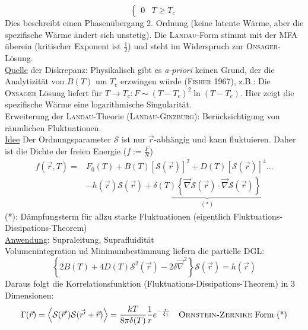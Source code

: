 \begin{enumerate}[A)]
\begin{equation}
\begin{cases}
            0 & T \geq T_c
        \end{cases}
    \end{equation}
    Dies beschreibt einen Phasenübergang 2. Ordnung (keine latente Wärme, aber die spezifische Wärme ändert sich unstetig).
    Die \textsc{Landau}-Form stimmt mit der MFA  überein (kritischer Exponent ist $\frac{1}{2}$) und steht im Widerspruch zur \textsc{Onsager}-Lösung. \\
    \underline{Quelle} der Diskrepanz: Physikalisch gibt es \emph{a-priori} keinen Grund, der die Analytizität von $B(T)$ um $T_c$ erzwingen würde (\textsc{Fisher} 1967),
    z.B.: Die \textsc{Onsager} Lösung liefert für $T \to T_c: F \sim (T-T_c)^2 \ln (T-T_c)$. Hier zeigt die spezifische Wärme eine logarithmische
    Singularität. \\[\baselineskip]
    Erweiterung der \textsc{Landau}-Theorie (\textsc{Landau-Ginzburg}): Berücksichtigung von räumlichen Fluktuationen. \\
    \underline{Idee} Der Ordnungsparameter $\mathcal{S}$ ist nur $\vec{r}$-abhängig und kann fluktuieren. Daher ist die Dichte der freien Energie ($f := \frac{F}{N}$)
    \begin{equation}
        \begin{split}
            f(\vec{r}, T) =& F_0(T) + B(T) \left[ \mathcal{S}(\vec{r}) \right]^2 + D(T) \left[ \mathcal{S}(\vec{r}) \right]^4 \ldots \\
            &- h(\vec{r}) \mathcal{S}(\vec{r}) + \underbrace{\delta(T) \left\{ \vec{\nabla} \mathcal{S}(\vec{r}) \cdot \vec{\nabla} \mathcal{S}(\vec{r}) \right\}}_{(*)}
        \end{split}
    \end{equation}
    (*): Dämpfungsterm für allzu starke Fluktuationen (eigentlich Fluktuations-Dis\-si\-pa\-tions-Theorem) \\
    \underline{Anwendung}: Supraleitung, Suprafluidität \\
    Volumenintegration ud Minimumbestimmung liefern die partielle DGL:
    \begin{equation}
        \left\{ 2 B(T) + 4D(T) \mathcal{S}^2 (\vec{r}) - 2 \delta \vec{\nabla}^2 \right\} \mathcal{S}(\vec{r}) = h(\vec{r})
    \end{equation}
    Daraus folgt die Korrelationsfunktion (Fluktuations-Dissipations-Theorem) in 3 Dimensionen:
    \begin{equation}
        \begin{split}
            \Gamma(\vec{r}) &= \avg{\mathcal{S}(\vec{r}') \mathcal{S} (\vec{r'}+\vec{r})} = \frac{k T}{8 \pi \delta (T)} \frac{1}{r} e^{-\frac{r}{\xi_1}} \quad \text{\textsc{Ornstein-Zernike} Form (*)} \\

\end{split}
\end{equation}
\end{enumerate}
